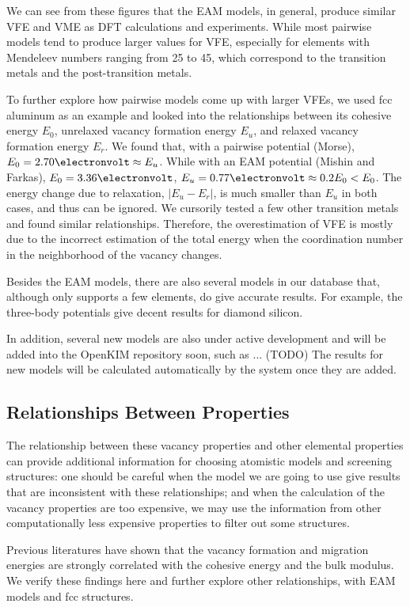 \documentclass[%
 reprint,
 nofootinbib,
 amsmath,amssymb,
 aps,
]{revtex4-1}
\begin{document}
We can see from these figures that the EAM models, in general, produce similar VFE and VME as DFT calculations and experiments.
While most pairwise models tend to produce larger values for VFE, especially for elements with Mendeleev numbers ranging from 25 to 45, which correspond to the transition metals and the post-transition metals.

To further explore how pairwise models come up with larger VFEs, we used fcc aluminum as an example and looked into the relationships between its cohesive energy $E_0$, unrelaxed vacancy formation energy $E_u$, and relaxed vacancy formation energy $E_r$.
We found that, with a pairwise potential (Morse), $E_0 = 2.70\electronvolt \approx E_u$.
While with an EAM potential (Mishin and Farkas), $E_0 = 3.36\electronvolt$, $E_u = 0.77\electronvolt \approx 0.2E_0 < E_0$.
The energy change due to relaxation, $|E_u-E_r|$, is much smaller than $E_u$ in both cases, and thus can be ignored.
We cursorily tested a few other transition metals and found similar relationships.
Therefore, the overestimation of VFE is mostly due to the incorrect estimation of the total energy when the coordination number in the neighborhood of the vacancy changes.

Besides the EAM models, there are also several models in our database that, although only supports a few elements, do give accurate results.
For example, the three-body potentials give decent results for diamond silicon.

In addition, several new models are also under active development and will be added into the OpenKIM repository soon, such as ... (TODO)
The results for new models will be calculated automatically by the system once they are added.

\subsection{\label{sec:calcvsprop}Relationships Between Properties}

The relationship between these vacancy properties and other elemental properties can provide additional information for choosing atomistic models and screening structures:
one should be careful when the model we are going to use give results that are inconsistent with these relationships;
and when the calculation of the vacancy properties are too expensive, we may use the information from other computationally less expensive properties to filter out some structures.

Previous literatures have shown that the vacancy formation and migration energies are strongly correlated with the cohesive energy and the bulk modulus.
We verify these findings here and further explore other relationships, with EAM models and fcc structures.
\end{document}
